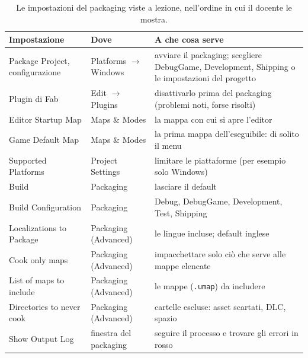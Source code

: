\begin{table}[htbp]
\centering
\small
\begin{tabular}{@{}p{4.6cm}p{2.8cm}p{6.6cm}@{}}
\toprule
\textbf{Impostazione} & \textbf{Dove} & \textbf{A che cosa serve} \\
\midrule
Package Project, configurazione & Platforms $\rightarrow$ Windows & avviare il packaging;
scegliere DebugGame, Development, Shipping o le impostazioni del progetto \\
Plugin di Fab & Edit $\rightarrow$ Plugins & disattivarlo prima del packaging (problemi
noti, forse risolti) \\
Editor Startup Map & Maps \& Modes & la mappa con cui si apre l'editor \\
Game Default Map & Maps \& Modes & la prima mappa dell'eseguibile: di solito il menu \\
Supported Platforms & Project Settings & limitare le piattaforme (per esempio solo Windows) \\
Build & Packaging & lasciare il default \\
Build Configuration & Packaging & Debug, DebugGame, Development, Test, Shipping \\
Localizations to Package & Packaging (Advanced) & le lingue incluse; default inglese \\
Cook only maps & Packaging (Advanced) & impacchettare solo ciò che serve alle mappe elencate \\
List of maps to include & Packaging (Advanced) & le mappe (\texttt{.umap}) da includere \\
Directories to never cook & Packaging (Advanced) & cartelle escluse: asset scartati, DLC,
spazio \\
Show Output Log & finestra del packaging & seguire il processo e trovare gli errori in rosso \\
\bottomrule
\end{tabular}
\caption{Le impostazioni del packaging viste a lezione, nell'ordine in cui il docente le
mostra.}
\label{ue16:tab:packaging}
\end{table}

